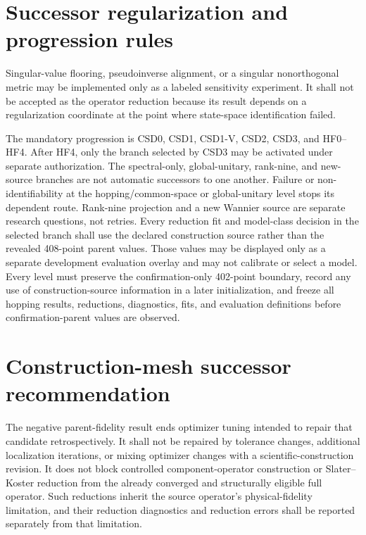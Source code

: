 \documentclass[11pt]{report}
\begin{document}
\chapter{Successor regularization and progression rules}

Singular-value flooring, pseudoinverse alignment, or a singular nonorthogonal metric may
be implemented only as a labeled sensitivity experiment.  It shall not be accepted as
the operator reduction because its result depends on a regularization coordinate at the
point where state-space identification failed.

The mandatory progression is CSD0, CSD1, CSD1-V, CSD2, CSD3, and HF0--HF4.  After
HF4, only the branch selected by CSD3 may be activated under separate authorization.
The spectral-only, global-unitary, rank-nine, and new-source branches are not automatic
successors to one another.  Failure or non-identifiability at the
hopping/common-space or global-unitary level stops its dependent route.  Rank-nine
projection and a new Wannier source are separate research questions, not retries.  Every
reduction fit and model-class decision in the selected branch shall use the declared construction
source rather than the revealed 408-point parent values.  Those values may be displayed
only as a separate development evaluation overlay and may not calibrate or select a
model.  Every level must preserve the confirmation-only 402-point boundary, record any
use of construction-source information in a later initialization, and freeze all
hopping results, reductions, diagnostics, fits, and evaluation definitions before
confirmation-parent values are observed.

\chapter{Construction-mesh successor recommendation}

The negative parent-fidelity result ends optimizer tuning intended to repair that
candidate retrospectively.  It shall not be repaired by tolerance changes, additional
localization iterations, or mixing optimizer changes with a scientific-construction
revision.  It does not block controlled component-operator construction or
Slater--Koster reduction from the already converged and structurally eligible full
operator.  Such reductions inherit the source operator's physical-fidelity limitation,
and their reduction diagnostics and reduction errors shall be reported separately from
that limitation.
\end{document}
